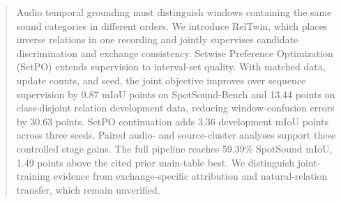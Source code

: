 \begin{abstract}
Audio temporal grounding must distinguish windows containing the same sound categories in different orders. We introduce RelTwin, which places inverse relations in one recording and jointly supervises candidate discrimination and exchange consistency. Setwise Preference Optimization (SetPO) extends supervision to interval-set quality. With matched data, update counts, and seed, the joint objective improves over sequence supervision by 0.87 mIoU points on SpotSound-Bench and 13.44 points on class-disjoint relation development data, reducing window-confusion errors by 30.63 points. SetPO continuation adds 3.36 development mIoU points across three seeds. Paired audio- and source-cluster analyses support these controlled stage gains. The full pipeline reaches 59.39\% SpotSound mIoU, 1.49 points above the cited prior main-table best. We distinguish joint-training evidence from exchange-specific attribution and natural-relation transfer, which remain unverified.
\end{abstract}
